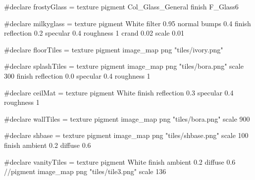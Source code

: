 #declare frostyGlass = texture {
  pigment {Col_Glass_General}
  finish {F_Glass6}
}

#declare milkyglass = texture { pigment {White filter 0.95}
             normal {bumps 0.4}
             finish {reflection 0.2 specular 0.4
                    roughness 1 crand 0.02}
            scale 0.01
}

#declare floorTiles  =  texture { 
  pigment { image_map {png "tiles/ivory.png"}  }
}

#declare splashTiles  =  texture { 
  pigment { image_map {png "tiles/bora.png"} scale 300 }
  finish {reflection 0.0 specular 0.4 roughness 1}
}

#declare ceilMat  =  texture { 
  pigment { White }  
  finish {reflection 0.3 specular 0.4 roughness 1}
}

#declare wallTiles = texture {
  pigment { image_map {png "tiles/bora.png"} scale 900 }
}

#declare shbase = texture {
  pigment { image_map { png "tiles/shbase.png"} scale 100 }
  finish {ambient 0.2  diffuse 0.6}
}

#declare vanityTiles  =  texture { 
  pigment { White }
  finish {ambient 0.2  diffuse 0.6}
  //pigment { image_map {png "tiles/tile3.png"} scale 136 }
}
